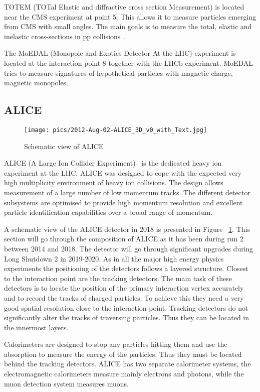 TOTEM (TOTal Elastic and diffractive cross section Measurement) is located near the CMS experiment at point 5. This allows it to measure particles emerging from CMS with small angles. The main goals is to measure the total, elastic and inelastic cross-sections in pp collisions~\cite{TOTEM}.

The MoEDAL (Monopole and Exotics Detector At the LHC) experiment is located at the interaction point 8 together with the LHCb experiment. MoEDAL tries to measure signatures of hypothetical particles with magnetic charge, magnetic monopoles.




\subsection{ALICE}
\label{sec:alice}


\begin{figure}[htb]
\centering
\texttt{[image: pics/2012-Aug-02-ALICE\_3D\_v0\_with\_Text.jpg]}
\caption[ALICE]{Schematic view of ALICE}
\label{fig:alice}
\end{figure}

ALICE (A Large Ion Collider Experiment)~\cite{ALICE} is the dedicated heavy ion experiment at the LHC. ALICE was designed to cope with the expected very high multiplicity environment of heavy ion collisions. The design allows measurement of a large number of low momentum tracks. The different detector subsystems are optimised to provide high momentum resolution and excellent particle identification capabilities over a broad range of momentum.

A schematic view of the ALICE detector in 2018 is presented in Figure ~\ref{fig:alice}. This section will go through the composition of ALICE as it has been during run 2 between 2014 and 2018. The detector will go through significant upgrades during Long Shutdown 2 in 2019-2020. As in all the major high energy physics experiments the positioning of the detectors follows a layered structure. Closest to the interaction point are the tracking detectors. The main task of these detectors is to locate the position of the primary interaction vertex accurately and to record the tracks of charged particles. To achieve this they need a very good spatial resolution close to the interaction point. Tracking detectors do not significantly alter the tracks of traversing particles. Thus they can be located in the innermost layers.

Calorimeters are designed to stop any particles hitting them and use the absorption to measure the energy of the particles. Thus they must be located behind the tracking detectors. ALICE has two separate calorimeter systems, the electromagnetic calorimeters measure mainly electrons and photons, while the muon detection system measures muons.


